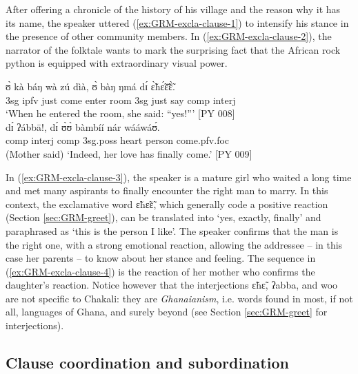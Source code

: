 \z
\z


After offering a chronicle of the history of his village and the reason why it has its name, the 
speaker 
uttered (\ref{ex:GRM-excla-clause-1}) to intensify his stance in the presence of other community 
members. In  (\ref{ex:GRM-excla-clause-2}), the narrator of the folktale wants to mark the 
surprising fact that the African rock python is equipped with extraordinary visual power.



\ea\label{ex:GRM-excla-clause-3-4}
\ea\label{ex:GRM-excla-clause-3}
\gll  ʊ̀ kà báŋ wà zú dìà, ʊ̀ bàŋ ŋmá dɪ́  ɛ̃̀hɛ̃́ɛ̃̄ɛ̃̀.\\
{\sc 3sg} {\sc ipfv} just come enter room  {\sc 3sg} just say {\sc comp}  {\sc interj}  \\
\glt `When he entered  the room,  she said: ``yes!''' [PY 008]\\

\ex\label{ex:GRM-excla-clause-4}
\gll dɪ́ ʔábbā!, dɪ́  ʊ̀ʊ̀ bàmbíí nár wááwáʊ́.\\
{\sc comp}  {\sc interj} {\sc comp}  {\sc 3sg.poss} heart person come.{\sc pfv.foc}\\
\glt (Mother said) `Indeed,   her love has finally come.'  [PY 009]\\

\z
\z

In  (\ref{ex:GRM-excla-clause-3}), the  speaker is a mature girl who waited a long time and met 
many aspirants to finally encounter the right man to marry. In this context, the exclamative word  
{\sls ɛ̃hɛ̃ɛ̃}, which generally code a positive reaction (Section \ref{sec:GRM-greet}),  can be 
translated into `yes, exactly, finally' and paraphrased as  `this is the person I like'.   The 
speaker confirms that the man is the right one, with a strong emotional reaction,  allowing the 
addressee -- in this case her parents -- to know about her stance and feeling. The sequence in  
(\ref{ex:GRM-excla-clause-4})  is the reaction of her mother who confirms the daughter's reaction. 
Notice however  that the interjections {\sls ɛ̃hɛ̃}, {\sls ʔabba}, and {\sls woo} are not specific 
to Chakali: they are {\it Ghanaianism}, i.e. words found in most, if not all, languages of Ghana, and surely beyond (see  Section \ref{sec:GRM-greet} for interjections).



\subsection{Clause coordination and subordination}
\label{GRM-clause-coord-subord}

